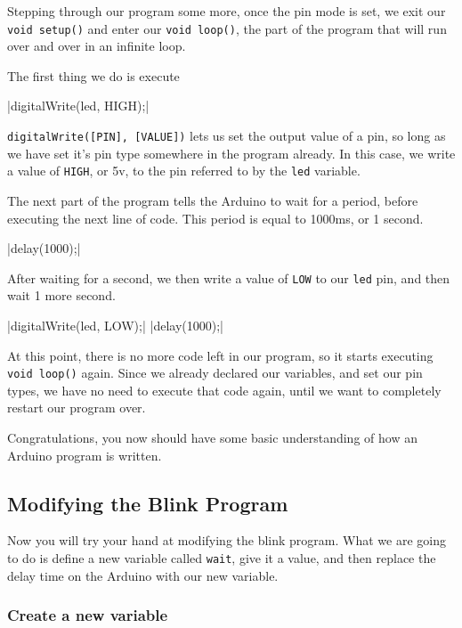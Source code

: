 \documentclass[11pt,a4paper]{article}
\begin{document}
Stepping through our program some more, once the pin mode is set, we exit our \texttt{void setup()} and enter our \texttt{void loop()}, the part of the program that will run over and over in an infinite loop. 

The first thing we do is execute 

|digitalWrite(led, HIGH);|

\texttt{digitalWrite([PIN], [VALUE])} lets us set the output value of a pin, so long as we have set it's pin type somewhere in the program already.  In this case, we write a value of \texttt{HIGH}, or 5v, to the pin referred to by the \texttt{led} variable.

The next part of the program tells the Arduino to wait for a period, before executing the next line of code.  This period is equal to 1000ms, or 1 second.

|delay(1000);|

After waiting for a second, we then write a value of \texttt{LOW} to our \texttt{led} pin, and then wait 1 more second.

|digitalWrite(led, LOW);|
|delay(1000);|

At this point, there is no more code left in our program, so it starts executing \texttt{void loop()} again.  Since we already declared our variables, and set our pin types, we have no need to execute that code again, until we want to completely restart our program over.


Congratulations, you now should have some basic understanding of how an Arduino program is written.


\subsection{Modifying the Blink Program} %
\label{sub:modifying_the_blink_program}

Now you will try your hand at modifying the blink program.  What we are going to do is define a new variable called \texttt{wait}, give it a value, and then replace the delay time on the Arduino with our new variable. 

\subsubsection{Create a new variable} %
\label{ssub:create_a_new_variable}
\end{document}
